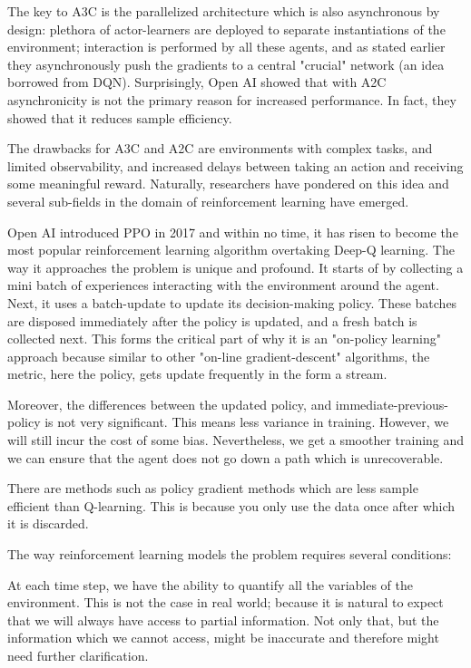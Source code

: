 \documentclass[conference]{IEEEtran}
\begin{document}
The key to A3C is the parallelized architecture which is also asynchronous by design: plethora of actor-learners are deployed to separate instantiations of the environment; interaction is performed by all these agents, and as stated earlier they asynchronously push the gradients to a central "crucial" network (an idea borrowed from DQN). Surprisingly, Open AI showed that with A2C asynchronicity is not the primary reason for increased performance. In fact, they showed that it reduces sample efficiency.

The drawbacks for A3C and A2C are environments with complex tasks, and limited observability, and increased delays between taking an action and receiving some meaningful reward. Naturally, researchers have pondered on this idea and several sub-fields in the domain of reinforcement learning have emerged.

Open AI introduced PPO in 2017 and within no time, it has risen to become the most popular reinforcement learning algorithm overtaking Deep-Q learning. The way it approaches the problem is unique and profound. It starts of by collecting a mini batch of experiences interacting with the environment around the agent. Next, it uses a batch-update to update its decision-making policy. These batches are disposed immediately after the policy is updated, and a fresh batch is collected next. This forms the critical part of why it is an "on-policy learning" approach because similar to other "on-line gradient-descent"  algorithms, the metric, here the policy, gets update frequently in the form a stream.

Moreover, the differences between the updated policy, and immediate-previous-policy is not very significant. This means less variance in training. However, we will still incur the cost of some bias. Nevertheless, we get a smoother training and we can ensure that the agent does not go down a path which is unrecoverable.

There are methods such as policy gradient methods which are less sample efficient than Q-learning. This is because you only use the data once after which it is discarded.

The way reinforcement learning models the problem requires several conditions:

At each time step, we have the ability to quantify all the variables of the environment. This is not the case in real world; because it is natural to expect that we will always have access to partial information. Not only that, but the information which we cannot access, might be inaccurate and therefore might need further clarification.
\end{document}
